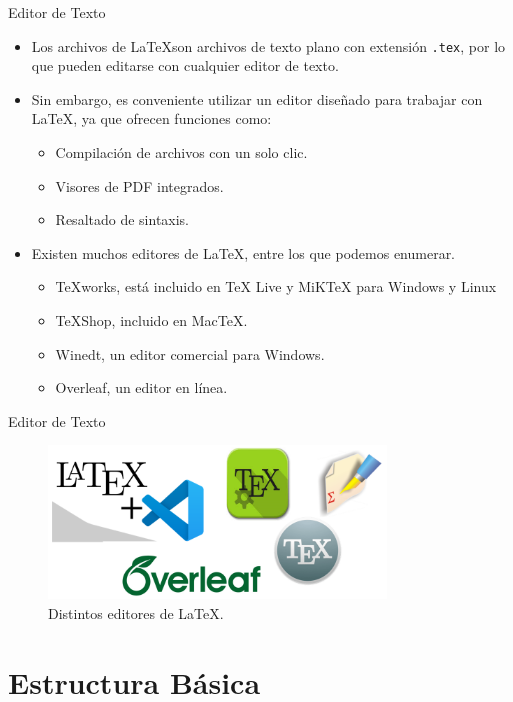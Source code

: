 \documentclass[12pt]{beamer}
\begin{document}
\begin{frame}{Editor de Texto}
  \begin{itemize}
    \item Los archivos de \LaTeX son archivos de texto plano con extensión \texttt{.tex}, por lo que pueden editarse con cualquier editor de texto.
    \item<2-> Sin embargo, es conveniente utilizar un editor diseñado para trabajar con LaTeX, ya que ofrecen funciones como:
    \begin{itemize}
      \item<3-> Compilación de archivos con un solo clic.
      \item<4-> Visores de PDF integrados.
      \item<5-> Resaltado de sintaxis.
    \end{itemize}
    \item<6-> Existen muchos editores de LaTeX, entre los que podemos enumerar.
    \begin{itemize}
      \item<7-> TeXworks, está incluido en TeX Live y MiKTeX para Windows y Linux
      \item<8-> TeXShop, incluido en MacTeX.
      \item<9-> Winedt, un editor comercial para Windows.
      \item<10-> Overleaf, un editor en línea.
    \end{itemize}    
  \end{itemize}
\end{frame}

\begin{frame}{Editor de Texto}  
    \begin{figure}
      \centering
      \includegraphics[width=0.8\textwidth]{Editores.png}
      \caption{Distintos editores de LaTeX.}
      \label{fig:ejemplo_imagen}
    \end{figure}
\end{frame}

\section{Estructura Básica}
\end{document}
